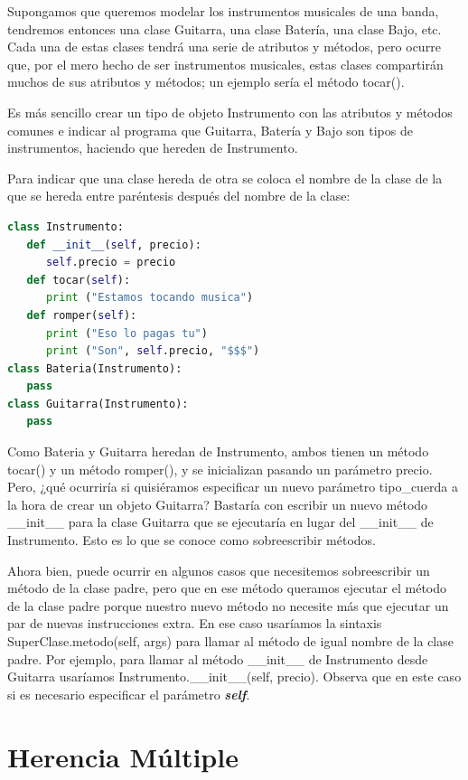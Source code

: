 \documentclass[12pt, twoside]{report}
\begin{document}
Supongamos que queremos modelar los instrumentos musicales de una banda, tendremos entonces una clase Guitarra, una clase Batería, una clase Bajo, etc. Cada una de estas clases tendrá una serie de atributos y métodos, pero ocurre que, por el mero hecho de ser instrumentos musicales, estas clases compartirán muchos de sus atributos y métodos; un ejemplo sería el método tocar().

Es más sencillo crear un tipo de objeto Instrumento con las atributos y métodos comunes e indicar al programa que Guitarra, Batería y Bajo son tipos de instrumentos, haciendo que hereden de Instrumento.

Para indicar que una clase hereda de otra se coloca el nombre de la clase de la que se hereda entre paréntesis después del nombre de la clase:

\begin{lstlisting}[language=Python]
class Instrumento:
   def __init__(self, precio):
      self.precio = precio
   def tocar(self):
      print ("Estamos tocando musica")
   def romper(self):
      print ("Eso lo pagas tu")
      print ("Son", self.precio, "$$$")
class Bateria(Instrumento):
   pass
class Guitarra(Instrumento):
   pass
\end{lstlisting}

Como Bateria y Guitarra heredan de Instrumento, ambos tienen un método tocar() y un método romper(), y se inicializan pasando un parámetro precio. Pero, ¿qué ocurriría si quisiéramos especificar un nuevo parámetro tipo\_cuerda a la hora de crear un objeto Guitarra? Bastaría con escribir un nuevo método \_\_init\_\_ para la clase Guitarra que se ejecutaría en lugar del \_\_init\_\_ de Instrumento. Esto es lo que se conoce como sobreescribir métodos.

Ahora bien, puede ocurrir en algunos casos que necesitemos sobreescribir un método de la clase padre, pero que en ese método queramos ejecutar el método de la clase padre porque nuestro nuevo método no necesite más que ejecutar un par de nuevas instrucciones extra. En ese caso usaríamos la sintaxis SuperClase.metodo(self, args) para llamar al método de igual nombre de la clase padre. Por ejemplo, para llamar al método \_\_init\_\_ de Instrumento desde Guitarra usaríamos Instrumento.\_\_init\_\_(self, precio). Observa que en este caso si es necesario especificar el parámetro \textbf{\textit{self}}.

\section{Herencia Múltiple}
\end{document}
